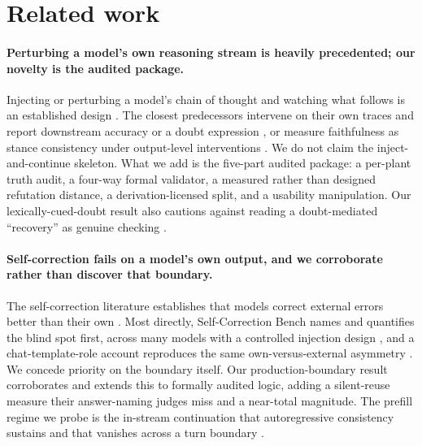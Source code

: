\section{Related work}
\label{sec:related}


\paragraph{Perturbing a model's own reasoning stream is heavily
precedented; our novelty is the audited package.} Injecting or perturbing a
model's chain of thought and watching what follows is an established design
\citep{vonrecum2026robust, aravindan2026fragile, shah2025reflection,
amjith2025flawed, han2026rfeval}. The closest predecessors intervene on
their own traces and report downstream accuracy or a doubt expression
\citep{vonrecum2026robust}, or measure faithfulness as stance consistency
under output-level interventions \citep{han2026rfeval}. We do not claim the
inject-and-continue skeleton. What we add is the five-part audited package:
a per-plant truth audit, a four-way formal validator, a measured rather than
designed refutation distance, a derivation-licensed split, and a
usability manipulation. Our lexically-cued-doubt result also cautions
against reading a doubt-mediated ``recovery'' as genuine checking
\citep{vonrecum2026robust}.

\paragraph{Self-correction fails on a model's own output, and we
corroborate rather than discover that boundary.} The self-correction
literature establishes that models correct external errors better than their
own \citep{huang2024cannot, tyen2024mistakes, kamoi2024selfcorrection}. Most
directly, Self-Correction Bench names and quantifies the blind spot first,
across many models with a controlled injection design
\citep{tsui2025blindspot}, and a chat-template-role account reproduces the
same own-versus-external asymmetry \citep{chen2026selfcorrection}. We concede
priority on the boundary itself. Our production-boundary result corroborates
and extends this to formally audited logic, adding a silent-reuse measure
their answer-naming judges miss and a near-total magnitude. The prefill
regime we probe is the in-stream continuation that autoregressive
consistency sustains and that vanishes across a turn boundary
\citep{qi2025shallow, lyu2026autoregressive, park2026inference}.

